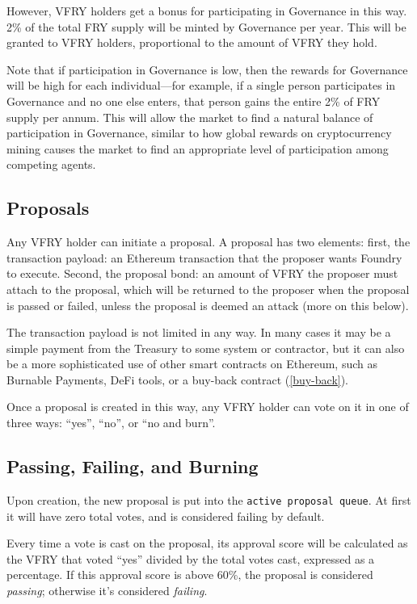 \documentclass{article}
\begin{document}
However, VFRY holders get a bonus for participating in Governance in this way. 2\% of the total FRY supply will be minted by Governance per year. This will be granted to VFRY holders, proportional to the amount of VFRY they hold.

Note that if participation in Governance is low, then the rewards for Governance will be high for each individual---for example, if a single person participates in Governance and no one else enters, that person gains the entire 2\% of FRY supply per annum. This will allow the market to find a natural balance of participation in Governance, similar to how global rewards on cryptocurrency mining causes the market to find an appropriate level of participation among competing agents.

\subsection{Proposals} \label{proposals}

Any VFRY holder can initiate a proposal. A proposal has two elements: first, the transaction payload: an Ethereum transaction that the proposer wants Foundry to execute. Second, the proposal bond: an amount of VFRY the proposer must attach to the proposal, which will be returned to the proposer when the proposal is passed or failed, unless the proposal is deemed an attack (more on this below).

The transaction payload is not limited in any way. In many cases it may be a simple payment from the Treasury to some system or contractor, but it can also be a more sophisticated use of other smart contracts on Ethereum, such as Burnable Payments, DeFi tools, or a buy-back contract (\ref{buy-back}).

Once a proposal is created in this way, any VFRY holder can vote on it in one of three ways: ``yes'', ``no'', or ``no and burn''.

\subsection{Passing, Failing, and Burning} \label{passing-failing-burning}

Upon creation, the new proposal is put into the \verb|active proposal queue|. At first it will have zero total votes, and is considered failing by default.

Every time a vote is cast on the proposal, its approval score will be calculated as the VFRY that voted ``yes'' divided by the total votes cast, expressed as a percentage. If this approval score is above 60\%, the proposal is considered \textit{passing}; otherwise it's considered \textit{failing}.
\end{document}
